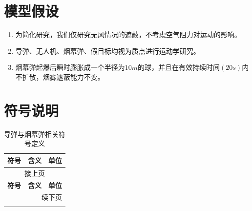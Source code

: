 \documentclass{ctexart}
\begin{document}
\section{模型假设}
\begin{enumerate}
    \item 为简化研究，我们仅研究无风情况的遮蔽，不考虑空气阻力对运动的影响。
    \item 导弹、无人机、烟幕弹、假目标均视为质点进行运动学研究。
    \item 烟幕弹起爆后瞬时膨胀成一个半径为$10m$的球，并且在有效持续时间$(20s)$内不扩散，烟雾遮蔽能力不变。
\end{enumerate}
\section{符号说明}
\begin{longtable}{@{} p{2.8cm} p{6.5cm} p{1.8cm} @{}}
\caption{导弹与烟幕弹相关符号定义}
\label{tab:symbols} \\
\toprule
\textbf{符号} & \textbf{含义} & \textbf{单位} \\
\midrule
\endfirsthead


\multicolumn{3}{c}{接上页} \\
\toprule
\textbf{符号} & \textbf{含义} & \textbf{单位} \\
\midrule
\endhead


\bottomrule
\multicolumn{3}{r}{续下页} \\
\endfoot


\bottomrule
\endlastfoot



\end{longtable}
\end{document}
